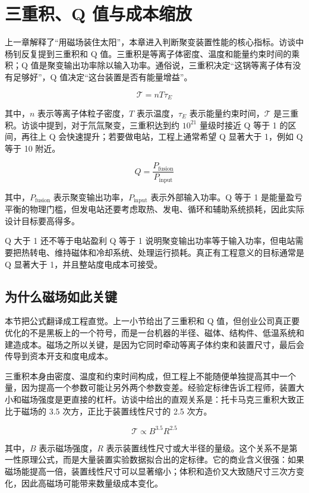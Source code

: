 \section{三重积、Q 值与成本缩放}

上一章解释了“用磁场装住太阳”，本章进入判断聚变装置性能的核心指标。访谈中杨钊反复提到三重积和 Q 值。三重积是等离子体密度、温度和能量约束时间的乘积；Q 值是聚变输出功率除以输入功率。通俗说，三重积决定“这锅等离子体有没有足够好”，Q 值决定“这台装置是否有能量增益”。

\[
\mathcal{T}=n T \tau_E
\]

其中，$n$ 表示等离子体粒子密度，$T$ 表示温度，$\tau_E$ 表示能量约束时间，$\mathcal{T}$ 是三重积。访谈中提到，对于氘氚聚变，三重积达到约 $10^{21}$ 量级时接近 Q 等于 1 的区间，再往上 Q 会快速提升；若要做电站，工程上通常希望 Q 显著大于 1，例如 Q 等于 10 附近。

\[
Q=\frac{P_{\mathrm{fusion}}}{P_{\mathrm{input}}}
\]

其中，$P_{\mathrm{fusion}}$ 表示聚变输出功率，$P_{\mathrm{input}}$ 表示外部输入功率。Q 等于 1 是能量盈亏平衡的物理门槛，但发电站还要考虑取热、发电、循环和辅助系统损耗，因此实际设计目标要高得多。

\begin{importantbox}{Q 大于 1 还不等于电站盈利}
Q 等于 1 说明聚变输出功率等于输入功率，但电站需要把热转电、维持磁体和冷却系统、处理运行损耗。真正有工程意义的目标通常是 Q 显著大于 1，并且整站度电成本可接受。
\end{importantbox}

\subsection{为什么磁场如此关键}

本节把公式翻译成工程直觉。上一小节给出了三重积和 Q 值，但创业公司真正要优化的不是黑板上的一个符号，而是一台机器的半径、磁体、结构件、低温系统和建造成本。磁场之所以关键，是因为它同时牵动等离子体约束和装置尺寸，最后会传导到资本开支和度电成本。

三重积本身由密度、温度和约束时间构成，但工程上不能随便单独提高其中一个量，因为提高一个参数可能让另外两个参数变差。经验定标律告诉工程师，装置大小和磁场强度是更直接的杠杆。访谈中给出的直观关系是：托卡马克三重积大致正比于磁场的 3.5 次方，正比于装置线性尺寸的 2.5 次方。

\[
\mathcal{T}\propto B^{3.5}R^{2.5}
\]

其中，$B$ 表示磁场强度，$R$ 表示装置线性尺寸或大半径的量级。这个关系不是第一性原理公式，而是大量装置实验数据拟合出的定标律。它的商业含义很强：如果磁场能提高一倍，装置线性尺寸可以显著缩小；体积和造价又大致随尺寸三次方变化，因此高磁场可能带来数量级成本变化。

